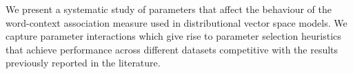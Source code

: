 We present a systematic study of parameters that affect the behaviour of the word-context association measure used in distributional vector space models. We capture parameter interactions which give rise to parameter selection heuristics that achieve performance across different datasets competitive with the results previously reported in the literature.
